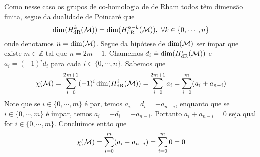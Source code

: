\begin{dem}
Como nesse caso os grupos de co-homologia de de Rham todos têm dimensão finita, segue da dualidade de Poincaré que
\[
\dim(H^k_{\text{dR}}(\mathcal{M})) = \dim(H^{n-k}_{\text{dR}}(\mathcal{M})), \ \forall k \in \{0, \cdots, n\}
\]
onde denotamos $n = \dim(\mathcal{M})$. Segue da hipótese de $\dim(\mathcal{M})$ ser ímpar que existe $m \in \mathbb{Z}$ tal que $n = 2m + 1$. Chamemos $d_i \doteq \dim(H^i_{\text{dR}}(\mathcal{M}))$ e $a_i = (-1)^i d_i$ para cada $i  \in \{0, \cdots, n\}$. Sabemos que 
\[
\chi(\mathcal{M}) = \sum_{i = 0}^{2m+1} (-1)^i \dim(H^i_{\text{dR}}(\mathcal{M})) = \sum_{i = 0}^{2m+1}a_i = \sum_{i = 0}^{m} (a_i + a_{n-i})
\]
Note que se $i\in \{0, \cdots, m\}$ é par, temos $a_i = d_i = -a_{n-i}$, enquanto que se $i\in \{0, \cdots, m\}$ é ímpar, temos $a_i = -d_i = -a_{n-i}$. Portanto $a_i + a_{n-i} = 0$ seja qual for $i\in \{0, \cdots, m\}$. Concluímos então que
\[
\chi(\mathcal{M}) = \sum_{i = 0}^{m} (a_i + a_{n-i}) =  \sum_{i = 0}^{m} 0 =  0
\]
\end{dem}




